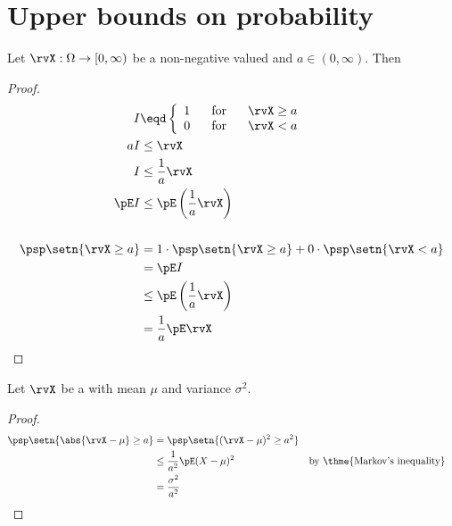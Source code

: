 \section{Upper bounds on probability}
\begin{theorem}
Let $\rvX:\Omega\to[0,\infty)$ be a non-negative valued  and
$a\in(0,\infty)$. Then
\end{theorem}
\begin{proof}
\begin{align*}
  I &\eqd \left\{ \begin{array}{l@{\hspace{4ex}\mbox{for}\hspace{4ex}}l}
    1 &\rvX\ge a \\
    0 &\rvX < a
    \end{array}\right.
\\
  aI &\le\rvX           \\
   I &\le \frac{1}{a}\rvX \\
   \pE I &\le \pE\left(\frac{1}{a}\rvX\right) \\
\\
   \psp\setn{\rvX\ge a}
     &= 1\cdot\psp\setn{\rvX\ge a} + 0\cdot\psp\setn{\rvX<a}
   \\&= \pE I
   \\&\le \pE\left(\frac{1}{a}\rvX \right)
   \\&=   \frac{1}{a}\pE\rvX
\end{align*}
\end{proof}


\begin{theorem}
Let $\rvX$ be a  with mean $\mu$ and variance $\sigma^2$.
\end{theorem}
\begin{proof}
\begin{align*}
  \psp\setn{\abs{\rvX-\mu} \ge a}
    &=   \psp\setn{ (\rvX-\mu)^2 \ge a^2}
  \\&\le \frac{1}{a^2} \pE(X-\mu)^2 
    && \text{by \thme{Markov's inequality}}
  \\&=   \frac{\sigma^2}{a^2}
\end{align*}
\end{proof}

